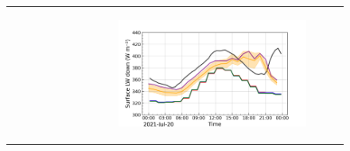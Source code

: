 \begin{figure}[hbtp]
\begin{tabular}{cc}
\begin{subfigure}[t]{0.5\textwidth}
        \end{subfigure} &
        \begin{subfigure}[t]{0.5\textwidth}
            \caption{}
            \includegraphics[width=\textwidth]{images/chap5/IOP_TS/TS_2021-07-20_elsplans_LWdnSFC.png}
        \end{subfigure} \\


\end{tabular}
\end{figure}
